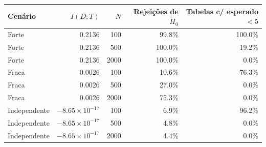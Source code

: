 \begin{tabular}{lrrrr}
\toprule
Cenário & $I(D;T)$ & $N$ & Rejeições de $H_0$ & Tabelas c/ esperado $<5$ \\
\midrule
Forte & 0.2136 & 100 & 99.8\% & 100.0\% \\
Forte & 0.2136 & 500 & 100.0\% & 19.2\% \\
Forte & 0.2136 & 2000 & 100.0\% & 0.0\% \\
Fraca & 0.0026 & 100 & 10.6\% & 76.3\% \\
Fraca & 0.0026 & 500 & 27.0\% & 0.0\% \\
Fraca & 0.0026 & 2000 & 75.3\% & 0.0\% \\
Independente & $-8.65\times 10^{-17}$ & 100 & 6.9\% & 96.2\% \\
Independente & $-8.65\times 10^{-17}$ & 500 & 4.8\% & 0.0\% \\
Independente & $-8.65\times 10^{-17}$ & 2000 & 4.4\% & 0.0\% \\
\bottomrule
\end{tabular}
